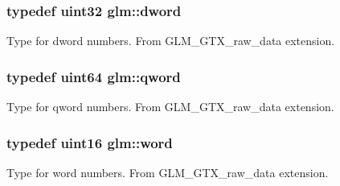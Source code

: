 \subsubsection[{dword}]{\setlength{\rightskip}{0pt plus 5cm}typedef uint32 {\bf glm\+::dword}}\label{group__gtx__raw__data_ga2ef8dddba26f43cba016c86f947294c1}
Type for dword numbers. From G\+L\+M\+\_\+\+G\+T\+X\+\_\+raw\+\_\+data extension. \hypertarget{group__gtx__raw__data_ga4f57913334aae35981524f5e968478f7}{}
\subsubsection[{qword}]{\setlength{\rightskip}{0pt plus 5cm}typedef uint64 {\bf glm\+::qword}}\label{group__gtx__raw__data_ga4f57913334aae35981524f5e968478f7}
Type for qword numbers. From G\+L\+M\+\_\+\+G\+T\+X\+\_\+raw\+\_\+data extension. \hypertarget{group__gtx__raw__data_ga9325d3875c8b96762adac1ae5ed701f4}{}
\subsubsection[{word}]{\setlength{\rightskip}{0pt plus 5cm}typedef uint16 {\bf glm\+::word}}\label{group__gtx__raw__data_ga9325d3875c8b96762adac1ae5ed701f4}
Type for word numbers. From G\+L\+M\+\_\+\+G\+T\+X\+\_\+raw\+\_\+data extension. 